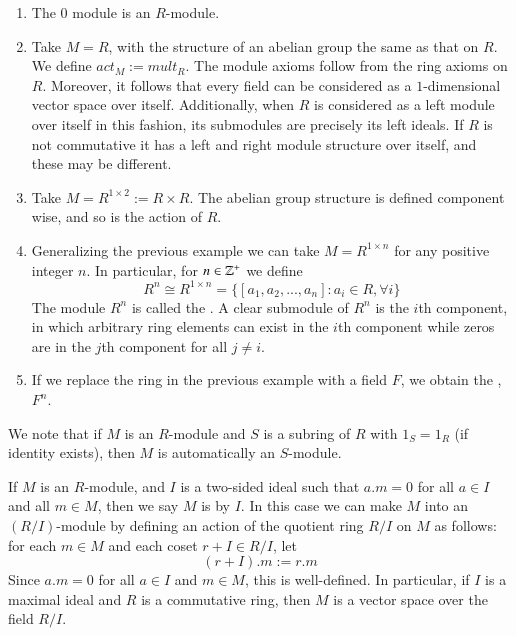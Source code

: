 \documentclass[12pt, a4paper, oneside, openright, titlepage]{book}
\begin{document}
\begin{eg}
    \leavevmode
    \begin{enumerate}
        \item The $0$ module is an $R$-module.
        \item Take $M =R$, with the structure of an abelian group the same as that on $R$. We define $act_M := mult_R$. The module axioms follow from the ring axioms on $R$. Moreover, it follows that every field can be considered as a $1$-dimensional vector space over itself. Additionally, when $R$ is considered as a left module over itself in this fashion, its submodules are precisely its left ideals. If $R$ is not commutative it has a left and right module structure over itself, and these may be different. 
        \item Take $M = R^{1\times 2} := R\times R$. The abelian group structure is defined component wise, and so is the action of $R$.
        \item Generalizing the previous example we can take $M = R^{1\times n}$ for any positive integer $n$. In particular, for $n \in \mathbb Z^+$ we define \begin{equation*}
                R^n \cong R^{1\times n}  = \{[a_1,a_2,...,a_n]: a_i \in R, \forall i\}
        \end{equation*}
            The module $R^n$ is called the . A clear submodule of $R^n$ is the $i$th component, in which arbitrary ring elements can exist in the $i$th component while zeros are in the $j$th component for all $j \neq i$.
        \item If we replace the ring in the previous example with a field $F$, we obtain the , $F^n$.
    \end{enumerate}
\end{eg}

We note that if $M$ is an $R$-module and $S$ is a subring of $R$ with $1_S = 1_R$ (if identity exists), then $M$ is automatically an $S$-module. 

\begin{defn}
    If $M$ is an $R$-module, and $I$ is a two-sided ideal such that $a.m = 0$ for all $a \in I$ and all $m \in M$, then we say $M$ is  by $I$. In this case we can make $M$ into an $(R/I)$-module by defining an action of the quotient ring $R/I$ on $M$ as follows: for each $m\in M$ and each coset $r+I \in R/I$, let \begin{equation*}
        (r+I).m := r.m
    \end{equation*}
    Since $a.m = 0$ for all $a \in I$ and $m \in M$, this is well-defined. In particular, if $I$ is a maximal ideal and $R$ is a commutative ring, then $M$ is a vector space over the field $R/I$.
\end{defn}
\end{document}
